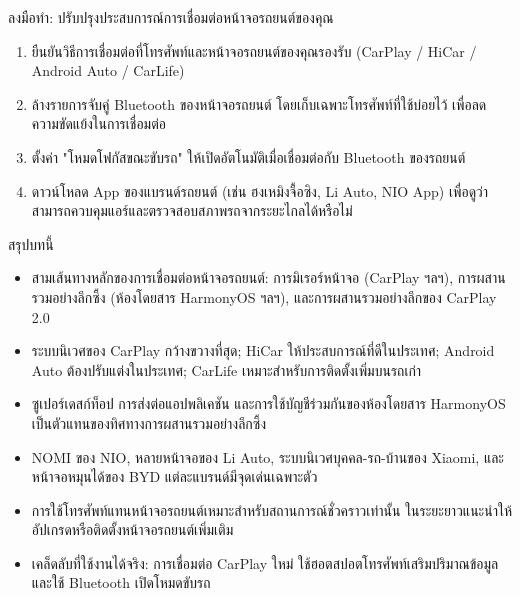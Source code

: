 \begin{tcbpractice}{ลงมือทำ: ปรับปรุงประสบการณ์การเชื่อมต่อหน้าจอรถยนต์ของคุณ}
\begin{enumerate}
  \item ยืนยันวิธีการเชื่อมต่อที่โทรศัพท์และหน้าจอรถยนต์ของคุณรองรับ (CarPlay / HiCar / Android Auto / CarLife)
  \item ล้างรายการจับคู่ Bluetooth ของหน้าจอรถยนต์ โดยเก็บเฉพาะโทรศัพท์ที่ใช้บ่อยไว้ เพื่อลดความขัดแย้งในการเชื่อมต่อ
  \item ตั้งค่า "โหมดโฟกัสขณะขับรถ" ให้เปิดอัตโนมัติเมื่อเชื่อมต่อกับ Bluetooth ของรถยนต์
  \item ดาวน์โหลด App ของแบรนด์รถยนต์ (เช่น ฮงเหมิงจื้อซิง, Li Auto, NIO App) เพื่อดูว่าสามารถควบคุมแอร์และตรวจสอบสภาพรถจากระยะไกลได้หรือไม่
\end{enumerate}

\end{tcbpractice}

\begin{tcbsummary}{สรุปบทนี้}
\begin{itemize}
  \item สามเส้นทางหลักของการเชื่อมต่อหน้าจอรถยนต์: การมิเรอร์หน้าจอ (CarPlay ฯลฯ), การผสานรวมอย่างลึกซึ้ง (ห้องโดยสาร HarmonyOS ฯลฯ), และการผสานรวมอย่างลึกของ CarPlay 2.0
  \item ระบบนิเวศของ CarPlay กว้างขวางที่สุด; HiCar ให้ประสบการณ์ที่ดีในประเทศ; Android Auto ต้องปรับแต่งในประเทศ; CarLife เหมาะสำหรับการติดตั้งเพิ่มบนรถเก่า
  \item ซูเปอร์เดสก์ท็อป การส่งต่อแอปพลิเคชัน และการใช้บัญชีร่วมกันของห้องโดยสาร HarmonyOS เป็นตัวแทนของทิศทางการผสานรวมอย่างลึกซึ้ง
  \item NOMI ของ NIO, หลายหน้าจอของ Li Auto, ระบบนิเวศบุคคล-รถ-บ้านของ Xiaomi, และหน้าจอหมุนได้ของ BYD แต่ละแบรนด์มีจุดเด่นเฉพาะตัว
  \item การใช้โทรศัพท์แทนหน้าจอรถยนต์เหมาะสำหรับสถานการณ์ชั่วคราวเท่านั้น ในระยะยาวแนะนำให้อัปเกรดหรือติดตั้งหน้าจอรถยนต์เพิ่มเติม
  \item เคล็ดลับที่ใช้งานได้จริง: การเชื่อมต่อ CarPlay ใหม่ ใช้ฮอตสปอตโทรศัพท์เสริมปริมาณข้อมูล และใช้ Bluetooth เปิดโหมดขับรถ
\end{itemize}

\end{tcbsummary}
